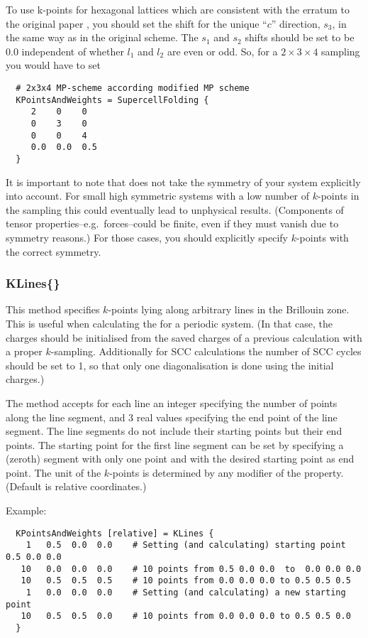 To use k-points for hexagonal lattices which are consistent with the
erratum to the original paper \cite{monkhorst-prb-16-1748}, you should
set the shift for the unique ``$c$'' direction, $s_3$, in the same way
as in the original scheme. The $s_1$ and $s_2$ shifts should be set to
be $0.0$ independent of whether $l_1$ and $l_2$ are even or odd.  So,
for a $2\times3\times4$ sampling you would have to set
\begin{verbatim}
  # 2x3x4 MP-scheme according modified MP scheme
  KPointsAndWeights = SupercellFolding {
     2    0    0
     0    3    0
     0    0    4
     0.0  0.0  0.5
  }
\end{verbatim}

It is important to note that \dftbp{} does not take the symmetry of
your system explicitly into account. For small high symmetric systems
with a low number of $k$-points in the sampling this could eventually
lead to unphysical results. (Components of tensor
properties--e.g.\ forces--could be finite, even if they must vanish
due to symmetry reasons.) For those cases, you should explicitly
specify $k$-points with the correct symmetry.


\subsubsection{KLines\{\}}
\label{sec:dftbp.KLines}

This method specifies $k$-points lying along arbitrary lines in the
Brillouin zone. This is useful when calculating the  for a periodic system. (In
that case, the charges should be initialised from the saved charges of
a previous calculation with a proper $k$-sampling. Additionally for
SCC calculations the number of SCC cycles should be set to 1, so that
only one diagonalisation is done using the initial charges.)

The  method accepts for each line an integer specifying
the number of points along the line segment, and 3 real values
specifying the end point of the line segment. The line segments do not
include their starting points but their end points. The starting point
for the first line segment can be set by specifying a (zeroth) segment
with only one point and with the desired starting point as end point.
The unit of the $k$-points is determined by any modifier of the
 property. (Default is relative coordinates.)

Example:
\invparskip
\begin{verbatim}
  KPointsAndWeights [relative] = KLines {
    1   0.5  0.0  0.0    # Setting (and calculating) starting point 0.5 0.0 0.0
   10   0.0  0.0  0.0    # 10 points from 0.5 0.0 0.0  to  0.0 0.0 0.0
   10   0.5  0.5  0.5    # 10 points from 0.0 0.0 0.0 to 0.5 0.5 0.5
    1   0.0  0.0  0.0    # Setting (and calculating) a new starting point
   10   0.5  0.5  0.0    # 10 points from 0.0 0.0 0.0 to 0.5 0.5 0.0
  }
\end{verbatim}

